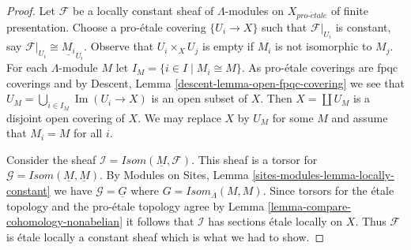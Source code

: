\documentclass[10pt,a4paper]{amsart}
\theoremstyle{plain}
\theoremstyle{definition}
\theoremstyle{remark}
\numberwithin{equation}{subsection}
\def\proetale{{pro\text{-}\acute{e}tale}}
\def\Im{\mathop{\mathrm{Im}}}
\begin{document}
\begin{proof}
Let $\mathcal{F}$ be a locally constant sheaf of $\Lambda$-modules
on $X_\proetale$ of finite presentation. Choose a pro-\'etale covering
$\{U_i \to X\}$ such that $\mathcal{F}|_{U_i}$ is constant, say
$\mathcal{F}|_{U_i} \cong \underline{M_i}_{U_i}$.
Observe that $U_i \times_X U_j$ is empty if $M_i$ is not isomorphic
to $M_j$.
For each $\Lambda$-module $M$ let $I_M = \{i \in I \mid M_i \cong M\}$.
As pro-\'etale coverings are fpqc coverings and by
Descent, Lemma \ref{descent-lemma-open-fpqc-covering}
we see that $U_M = \bigcup_{i \in I_M} \Im(U_i \to X)$
is an open subset of $X$. Then $X = \coprod U_M$ is a disjoint
open covering of $X$. We may replace $X$ by $U_M$ for some $M$ and
assume that $M_i = M$ for all $i$.

\medskip\noindent
Consider the sheaf $\mathcal{I} = \mathit{Isom}(\underline{M}, \mathcal{F})$.
This sheaf is a torsor for
$\mathcal{G} = \mathit{Isom}(\underline{M}, \underline{M})$.
By Modules on Sites, Lemma \ref{sites-modules-lemma-locally-constant}
we have $\mathcal{G} = \underline{G}$
where $G = \mathit{Isom}_\Lambda(M, M)$.
Since torsors for the \'etale topology
and the pro-\'etale topology agree by
Lemma \ref{lemma-compare-cohomology-nonabelian}
it follows that $\mathcal{I}$ has sections \'etale locally on $X$.
Thus $\mathcal{F}$ is \'etale locally a constant sheaf which is
what we had to show.
\end{proof}
\end{document}

